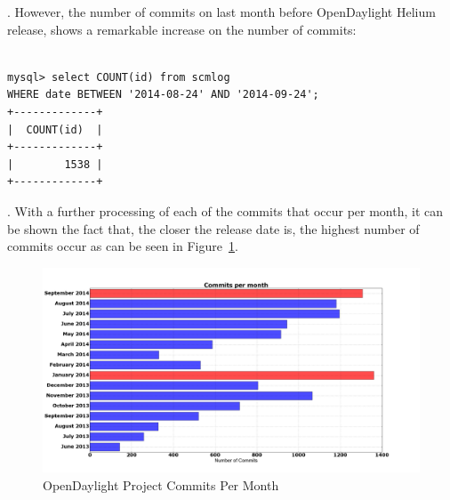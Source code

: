 \documentclass[a4paper, 12pt]{book}
\begin{document}
. However, the number of commits on last month before OpenDaylight Helium release, shows a remarkable increase on the number of commits:

\begin{verbatim}

mysql> select COUNT(id) from scmlog
WHERE date BETWEEN '2014-08-24' AND '2014-09-24';
+-------------+
|  COUNT(id)  |
+-------------+
|        1538 |
+-------------+

\end{verbatim}
.
With a further processing of each of the commits that occur per month, it can be shown the fact that, the closer the release date is, the highest number of commits occur as can be seen in Figure~\ref{fig:odl_commits_month}.
\begin{center}
 \begin{figure}
 \begin{center}
   \includegraphics[width=17cm]{img/commits_month_01.png}
   \caption{OpenDaylight Project Commits Per Month}
   \label{fig:odl_commits_month}
 \end{center}
 \end{figure}
\end{center}
\end{document}
